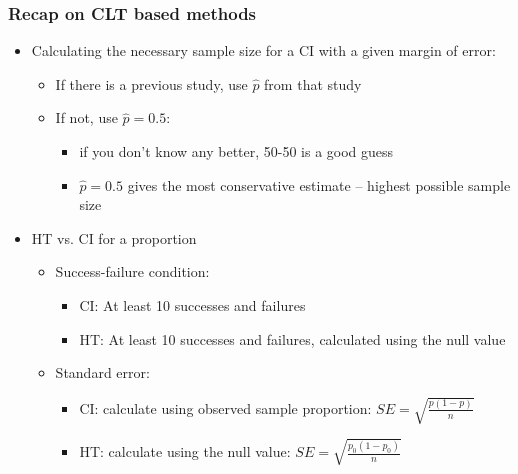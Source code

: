 \documentclass[11pt,containsverbatim,handout,xcolor=xelatex,dvipsnames,table]{beamer}
\begin{document}
\begin{frame}
\frametitle{Recap on CLT based methods}

\begin{itemize}

\item Calculating the necessary sample size for a CI with a given margin of error:
\begin{itemize}
\item If there is a previous study, use $\hat{p}$ from that study
\item If not, use $\hat{p} = 0.5$:
\begin{itemize}
\item if you don't know any better, 50-50 is a good guess
\item $\hat{p} = 0.5$ gives the most conservative estimate -- highest possible sample size
\end{itemize}
\end{itemize}

\pause

\item HT vs. CI for a proportion
\begin{itemize}

\item Success-failure condition:
\begin{itemize}
\item CI: At least 10  successes and failures
\item HT: At least 10  successes and failures, calculated using the null value
\end{itemize}

\item Standard error:
\begin{itemize}
\item CI: calculate using observed sample proportion: $SE = \sqrt{\frac{p(1-p)}{n}}$
\item HT: calculate using the null value: $SE = \sqrt{\frac{p_0(1-p_0)}{n}}$
\end{itemize}

\end{itemize}


\end{itemize}

\end{frame}

\end{document}
